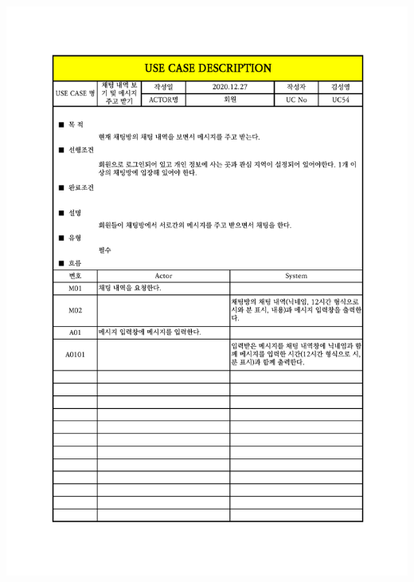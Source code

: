 {{{{{{{{{{{{{{{{{{{{{{{{{{{{{{{{{{{{{{{{{{{{{{{{{{{{{{{{{\includegraphics[width=1.1\textwidth]{./Figure/Design/Display/usecase/054.pdf} \\
}}}}}}}}}}}}}}}}}}}}}}}}}}}}}}}}}}}}}}}}}}}}}}}}}}}}}}}}}
